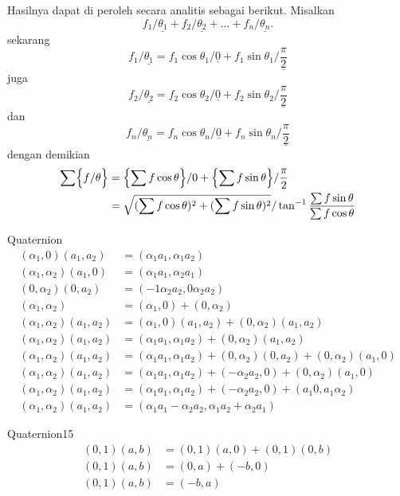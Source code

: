 \documentclass{article}
\begin{document}
Hasilnya dapat di peroleh secara analitis sebagai berikut.
Misalkan 
\[
f_1/\underline{\theta_1} + f_2/\underline{\theta_2} +  ... + f_n/\underline{\theta_n}.
\]
sekarang
\[
f_1/\underline{\theta_1} = f_1\cos\theta_1/\underline{0} + f_1\sin\theta_1/\underline{\frac{\pi}{2}} 
\]
juga
\[
f_2/\underline{\theta_2} = f_2\cos\theta_2/\underline{0} + f_2\sin\theta_2/\underline{\frac{\pi}{2}} 
\]
dan
\[
f_n/\underline{\theta_n} = f_n\cos\theta_n/\underline{0} + f_n\sin\theta_n/\underline{\frac{\pi}{2}} 
\]
dengan demikian
\begin{align*}
\sum\Bigl\lbrace f/\theta \Bigr\rbrace &= \Bigl\lbrace \sum{f \cos\theta}\Bigr\rbrace/0 + \Bigl\lbrace\sum{f \sin\theta}\Bigr\rbrace/\frac{\pi}{2}\\
&=\sqrt{(\sum{f \cos\theta})^2 + (\sum{f \sin \theta})^2}/\tan^{-1}\frac{\sum f \sin \theta}{\sum f \cos \theta}
\end{align*}

Quaternion
\begin{align*}
(\alpha_1, 0) (a_1, a_2) &= (\alpha_1 a_1, \alpha_1 a_2)\\
(\alpha_1, \alpha_2) (a_1, 0) &= (\alpha_1 a_1, \alpha_2 a_1)\\
(0, \alpha_2)(0, a_2) &= (-1 \alpha_2 a_2, 0 \alpha_2 a_2)\\
(\alpha_1, \alpha_2) &= (\alpha_1, 0) + (0, \alpha_2)\\
(\alpha_1, \alpha_2) (a_1, a_2) &= (\alpha_1, 0)(a_1, a_2) + (0, \alpha_2)(a_1, a_2)\\
(\alpha_1, \alpha_2) (a_1, a_2) &= (\alpha_1 a_1, \alpha_1 a_2) + (0, \alpha_2)(a_1, a_2)\\
(\alpha_1, \alpha_2) (a_1, a_2) &= (\alpha_1 a_1, \alpha_1 a_2) + (0, \alpha_2)(0, a_2) + (0, \alpha_2)(a_1, 0)\\
(\alpha_1, \alpha_2) (a_1, a_2) &= (\alpha_1 a_1, \alpha_1 a_2) + (-\alpha_2 a_2, 0) + (0, \alpha_2)(a_1, 0)\\
(\alpha_1, \alpha_2) (a_1, a_2) &= (\alpha_1 a_1, \alpha_1 a_2) + (-\alpha_2 a_2, 0) + (a_1 0, a_1 \alpha_2)\\
(\alpha_1, \alpha_2) (a_1, a_2) &= (\alpha_1 a_1 -\alpha_2 a_2 , \alpha_1 a_2 + \alpha_2 a_1)
\end{align*}

Quaternion15
\begin{align*}
(0, 1)(a, b) &= (0, 1)(a, 0) + (0, 1)(0, b)\\
(0, 1)(a, b) &= (0, a) + (-b, 0)\\
(0, 1)(a, b) &= (-b, a)
\end{align*}
\end{document}
